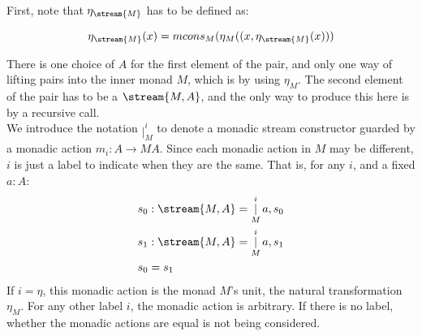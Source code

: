 First, note that $\eta_{\stream{M}}$ has to be defined as:

$$\eta_{\stream{M}}(x) = mcons_M(\eta_M ((x, \eta_{\stream{M}}(x)))$$ 

There is one choice of $A$ for the first element of the pair, and only one way of lifting pairs into the inner monad $M$, which is by using $\eta_M$. The second element of the pair has to be a $\stream{M,A}$, and the only way to produce this here is by a recursive call.\\

We introduce the notation $\mathop{|}_M^i$ to denote a monadic stream constructor guarded by a monadic action $m_i : A \to MA$. Since each monadic action in $M$ may be different, $i$ is just a label to indicate when they are the same. That is, for any $i$, and a fixed $a : A$:
\begin{align*}
&s_0 : \stream{M,A} = \mathop{|}_M^i a, s_0\\
&s_1 : \stream{M,A} = \mathop{|}_M^i a, s_1\\
&s_0 = s_1
\end{align*}
If $i = \eta$, this monadic action is the monad $M$'s unit, the natural transformation $\eta_M$. For any other label $i$, the monadic action is arbitrary. If there is no label, whether the monadic actions are equal is not being considered.\\

